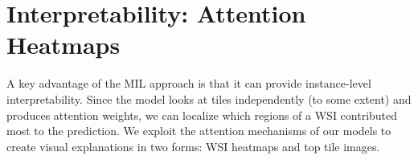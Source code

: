 



\section{Interpretability: Attention Heatmaps}
\label{sec:interpretability}
A key advantage of the MIL approach is that it can provide instance-level interpretability. Since the model looks at tiles independently (to some extent) and produces attention weights, we can localize which regions of a WSI contributed most to the prediction. We exploit the attention mechanisms of our models to create visual explanations in two forms: WSI heatmaps and top tile images.

